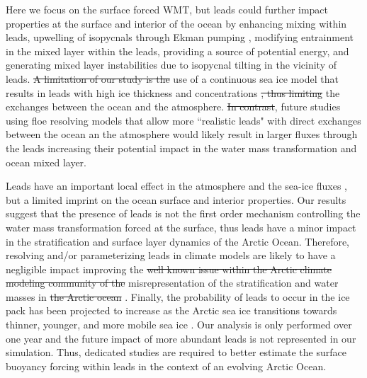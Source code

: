 \documentclass[lineno,sn-basic]{sn-jnl}%
\providecommand{\DIFadd}[1]{{\protect\color{blue}\uwave{#1}}} %
\providecommand{\DIFdel}[1]{{\protect\color{red}\sout{#1}}}                      %
\providecommand{\DIFaddbegin}{} %
\providecommand{\DIFaddend}{} %
\providecommand{\DIFdelbegin}{} %
\providecommand{\DIFdelend}{} %
\newcommand{\DIFscaledelfig}{0.5}
\newlength{\DIFdelgraphicswidth} %
\newlength{\DIFdelgraphicsheight} %
\newcommand{\DIFaddincludegraphics}[2][]{{\color{blue}\fbox{\DIFOincludegraphics[#1]{#2}}}} %
\newcommand{\DIFdelincludegraphics}[2][]{%
\sbox{\DIFdelgraphicsbox}{\DIFOincludegraphics[#1]{#2}}%
\settoboxwidth{\DIFdelgraphicswidth}{\DIFdelgraphicsbox} %
\settoboxtotalheight{\DIFdelgraphicsheight}{\DIFdelgraphicsbox} %
\scalebox{\DIFscaledelfig}{%
\parbox[b]{\DIFdelgraphicswidth}{\usebox{\DIFdelgraphicsbox}\\[-\baselineskip] \rule{\DIFdelgraphicswidth}{0em}}\llap{\resizebox{\DIFdelgraphicswidth}{\DIFdelgraphicsheight}{%
\setlength{\unitlength}{\DIFdelgraphicswidth}%
\begin{picture}(1,1)%
\thicklines\linethickness{2pt} %
{\color[rgb]{1,0,0}\put(0,0){\framebox(1,1){}}}%
{\color[rgb]{1,0,0}\put(0,0){\line( 1,1){1}}}%
{\color[rgb]{1,0,0}\put(0,1){\line(1,-1){1}}}%
\end{picture}%
}\hspace*{3pt}}} %
} %
\DeclareRobustCommand{\DIFaddbegin}{\DIFOaddbegin \let\includegraphics\DIFaddincludegraphics} %
\DeclareRobustCommand{\DIFaddend}{\DIFOaddend \let\includegraphics\DIFOincludegraphics} %
\DeclareRobustCommand{\DIFdelbegin}{\DIFOdelbegin \let\includegraphics\DIFdelincludegraphics} %
\DeclareRobustCommand{\DIFdelend}{\DIFOaddend \let\includegraphics\DIFOincludegraphics} %
\begin{document}
Here we focus on the surface forced WMT, but leads could further impact properties at the surface and interior of the ocean by enhancing mixing within leads, upwelling of isopycnals through Ekman pumping \citep{McPhee_LKF_2005}, modifying  entrainment in the mixed layer within the leads, providing a source of potential energy, and generating mixed layer instabilities due to isopycnal tilting in the vicinity of leads. \DIFdelbegin \DIFdel{A limitation of our study is the }\DIFdelend \DIFaddbegin \DIFadd{The }\DIFaddend use of a continuous sea ice model that results in leads with high ice thickness and concentrations \DIFdelbegin \DIFdel{, thus limiting }\DIFdelend \DIFaddbegin \DIFadd{limits }\DIFaddend the exchanges between the ocean and the atmosphere. \DIFdelbegin \DIFdel{In contrast}\DIFdelend \DIFaddbegin \DIFadd{Therefore}\DIFaddend , future studies using floe resolving models that allow more ``realistic leads" with direct exchanges between the ocean an the atmosphere would likely result in larger fluxes through the leads increasing their potential impact in the water mass transformation and ocean mixed layer.

Leads have an important local effect in the atmosphere and the sea-ice fluxes \citep{Lupkes_leads_2008,Marcq_flux_lead_2012, Wettlaufer_insulator_1997, Smith_polynyas_1990}, but a limited imprint on the ocean surface and interior properties. Our results suggest that the presence of leads is not the first order mechanism controlling the water mass transformation forced at the surface, thus leads have a minor impact in the stratification and surface layer dynamics of the Arctic Ocean.
Therefore, resolving and/or parameterizing leads in climate models are likely to have a negligible impact improving the \DIFdelbegin \DIFdel{well known issue within the Arctic climate modeling community of the }\DIFdelend misrepresentation of the stratification and water masses in \DIFdelbegin \DIFdel{the Arctic ocean }\DIFdelend \DIFaddbegin \DIFadd{Arctic climate models }\DIFaddend \citep{Wang_ompi_2024,Ilicak_core_2016}. Finally, the probability of leads to occur in the ice pack has been projected to increase as the Arctic sea ice transitions towards thinner, younger, and more mobile sea ice \citep{Boutin_rheology_2023, IPCC_arctic_2022}. Our analysis is only performed over one year and the future impact of more abundant leads is not represented in our simulation. Thus, dedicated studies are required to better estimate the surface buoyancy forcing within leads in the context of an evolving Arctic Ocean.  
\end{document}
